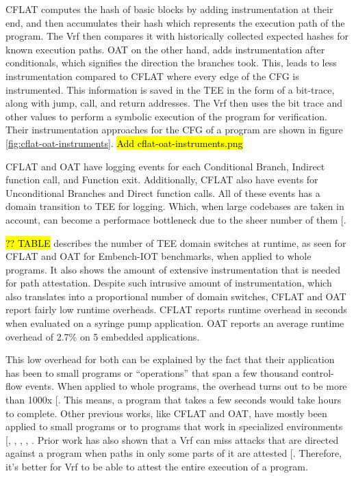 \documentclass[a4paper, nobind]{templates/ociamthesis}
\begin{document}
CFLAT computes the hash of basic blocks by adding instrumentation at their end,
and then accumulates their hash which represents the execution path of the program.
The Vrf then compares it with historically collected expected hashes for known
execution paths.
OAT on the other hand, adds instrumentation after conditionals, which signifies
the direction the branches took. This, leads to less instrumentation compared to
CFLAT where every edge of the CFG is instrumented.
This information is saved in the TEE in the form of a bit-trace, along with
jump, call, and return addresses.
The Vrf then uses the bit trace and other values to perform a symbolic execution
of the program for verification.
Their instrumentation approaches for the CFG of a program
are shown in figure \ref{fig:cflat-oat-instruments}.
\hl{Add cflat-oat-instruments.png}

CFLAT and OAT have logging events for each Conditional Branch, Indirect function call, and Function exit.
Additionally, CFLAT also have events for Unconditional Branches and Direct function calls.
All of these events has a domain transition to TEE for logging. Which, when large codebases
are taken in account, can become a performace bottleneck due to the sheer number of them {[}\citeproc{ref-blast}{55}{]}.

\hl{?? TABLE} describes the number of TEE domain switches at runtime,
as seen for CFLAT and OAT for Embench-IOT benchmarks, when applied to whole programs.
It also shows the amount of extensive instrumentation that is needed for path attestation.
Despite such intrusive amount of instrumentation, which also translates into
a proportional number of domain switches, CFLAT and OAT report fairly low runtime overheads.
CFLAT reports runtime overhead in seconds when evaluated on a syringe pump application.
OAT reports an average runtime overhead of 2.7\% on 5 embedded applications.

This low overhead for both can be explained by the fact that their application
has been to small programs or ``operations'' that span a few thousand control-flow events.
When applied to whole programs, the overhead turns out to be more than 1000x {[}\citeproc{ref-blast}{55}{]}.
This means, a program that takes a few seconds would take hours to complete.
Other previous works, like CFLAT and OAT, have mostly been applied to small
programs or to programs that work in specialized environments {[}, , , , \citeproc{ref-blast}{55}{]}.
Prior work has also shown that a Vrf can miss attacks that are directed against
a program when paths in only some parts of it are attested {[}\citeproc{ref-hu2019probability}{29}{]}.
Therefore, it's better for Vrf to be able to attest the entire execution of a program.
\end{document}
